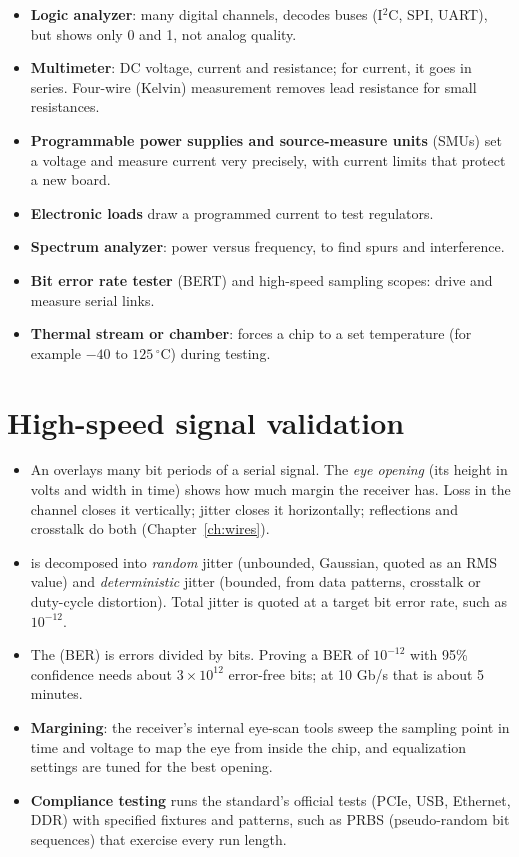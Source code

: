 \begin{itemize}
  \item \textbf{Logic analyzer}: many digital channels, decodes buses (I$^2$C, SPI, UART), but shows only 0 and 1, not analog quality.
  \item \textbf{Multimeter}: DC voltage, current and resistance; for current, it goes in series. Four-wire (Kelvin) measurement removes lead resistance for small resistances.
  \item \textbf{Programmable power supplies and source-measure units} (SMUs) set a voltage and measure current very precisely, with current limits that protect a new board.
  \item \textbf{Electronic loads} draw a programmed current to test regulators.
  \item \textbf{Spectrum analyzer}: power versus frequency, to find spurs and interference.
  \item \textbf{Bit error rate tester} (BERT) and high-speed sampling scopes: drive and measure serial links.
  \item \textbf{Thermal stream or chamber}: forces a chip to a set temperature (for example $-40$ to $125\,^{\circ}$C) during testing.
\end{itemize}

\section{High-speed signal validation}

\begin{itemize}
  \item An  overlays many bit periods of a serial signal. The \emph{eye opening} (its height in volts and width in time) shows how much margin the receiver has. Loss in the channel closes it vertically; jitter closes it horizontally; reflections and crosstalk do both (Chapter~\ref{ch:wires}).
  \item {} is decomposed into \emph{random} jitter (unbounded, Gaussian, quoted as an RMS value) and \emph{deterministic} jitter (bounded, from data patterns, crosstalk or duty-cycle distortion). Total jitter is quoted at a target bit error rate, such as $10^{-12}$.
  \item The  (BER) is errors divided by bits. Proving a BER of $10^{-12}$ with 95\% confidence needs about $3 \times 10^{12}$ error-free bits; at 10 Gb/s that is about 5 minutes.
  \item \textbf{Margining}: the receiver's internal eye-scan tools sweep the sampling point in time and voltage to map the eye from inside the chip, and equalization settings are tuned for the best opening.
  \item \textbf{Compliance testing} runs the standard's official tests (PCIe, USB, Ethernet, DDR) with specified fixtures and patterns, such as PRBS (pseudo-random bit sequences) that exercise every run length.
\end{itemize}

